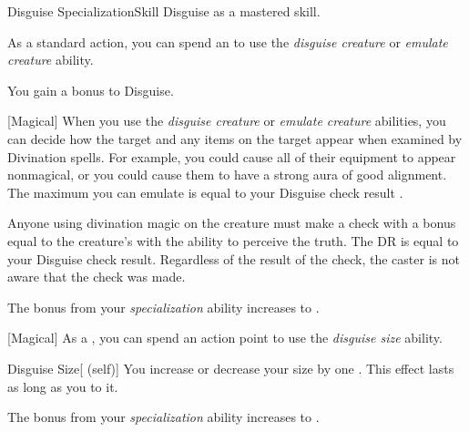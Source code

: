     \begin{feat}{Disguise Specialization}{Skill}
        \featpre Disguise as a mastered skill.

         As a standard action, you can spend an  to use the \textit{disguise creature} or \textit{emulate creature} ability.

         You gain a  bonus to Disguise.

        [Magical] When you use the \textit{disguise creature} or \textit{emulate creature} abilities, you can decide how the target and any items on the target appear when examined by Divination spells.
        For example, you could cause all of their equipment to appear nonmagical, or you could cause them to have a strong aura of good alignment.
        The maximum  you can emulate is equal to your Disguise check result .

        Anyone using divination magic on the creature must make a check with a bonus equal to the creature's  with the ability to perceive the truth.
        The DR is equal to your Disguise check result.
        Regardless of the result of the check, the caster is not aware that the check was made.

         The bonus from your \textit{specialization} ability increases to .

        [Magical] As a , you can spend an action point to use the \textit{disguise size} ability.
        \begin{ability}{Disguise Size}[ (self)]
            You increase or decrease your size by one .
            This effect lasts as long as you  to it.
        \end{ability}

         The bonus from your \textit{specialization} ability increases to .
    \end{feat}

